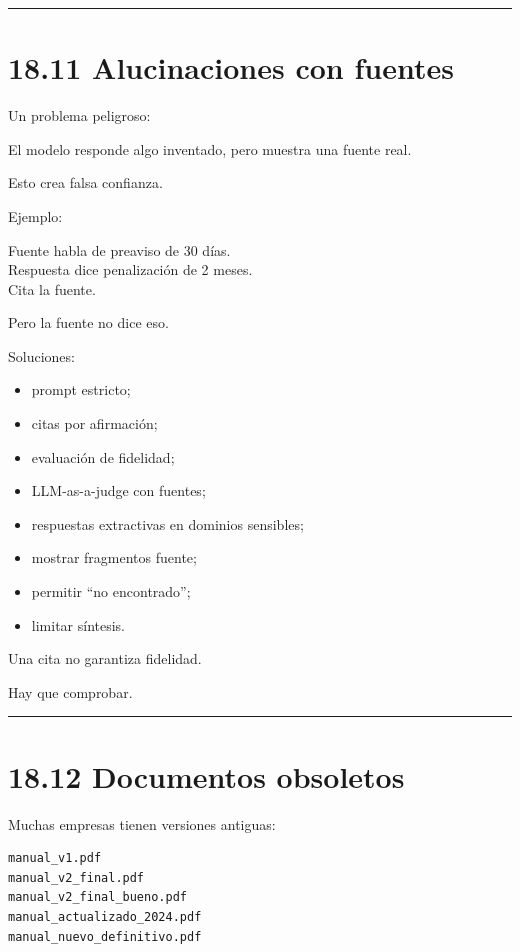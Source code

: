 \begin{center}\rule{0.5\linewidth}{0.5pt}\end{center}

\section{18.11 Alucinaciones con
fuentes}\label{alucinaciones-con-fuentes}

Un problema peligroso:

El modelo responde algo inventado, pero muestra una fuente real.

Esto crea falsa confianza.

Ejemplo:

Fuente habla de preaviso de 30 días.\\
Respuesta dice penalización de 2 meses.\\
Cita la fuente.

Pero la fuente no dice eso.

Soluciones:

\begin{itemize}
\tightlist
\item
  prompt estricto;
\item
  citas por afirmación;
\item
  evaluación de fidelidad;
\item
  LLM-as-a-judge con fuentes;
\item
  respuestas extractivas en dominios sensibles;
\item
  mostrar fragmentos fuente;
\item
  permitir ``no encontrado'';
\item
  limitar síntesis.
\end{itemize}

Una cita no garantiza fidelidad.

Hay que comprobar.

\begin{center}\rule{0.5\linewidth}{0.5pt}\end{center}

\section{18.12 Documentos obsoletos}\label{documentos-obsoletos}

Muchas empresas tienen versiones antiguas:

\begin{lstlisting}
manual_v1.pdf
manual_v2_final.pdf
manual_v2_final_bueno.pdf
manual_actualizado_2024.pdf
manual_nuevo_definitivo.pdf
\end{lstlisting}

